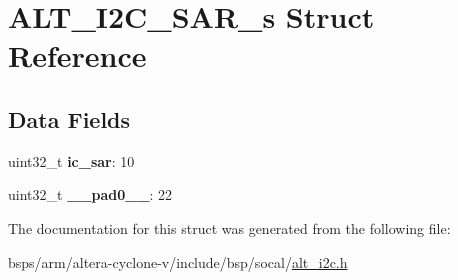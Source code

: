\hypertarget{structALT__I2C__SAR__s}{}\section{A\+L\+T\+\_\+\+I2\+C\+\_\+\+S\+A\+R\+\_\+s Struct Reference}
\label{structALT__I2C__SAR__s}
\subsection*{Data Fields}
\begin{DoxyCompactItemize}
\item 
\mbox{\label{structALT__I2C__SAR__s_a409b8c9e61ebc29fd64042c980d45e53}} 
uint32\+\_\+t {\bfseries ic\+\_\+sar}\+: 10
\item 
\mbox{\label{structALT__I2C__SAR__s_ad00be89795679c8f2c34365d183e3598}} 
uint32\+\_\+t {\bfseries \+\_\+\+\_\+pad0\+\_\+\+\_\+}\+: 22
\end{DoxyCompactItemize}


The documentation for this struct was generated from the following file\+:\begin{DoxyCompactItemize}
\item 
bsps/arm/altera-\/cyclone-\/v/include/bsp/socal/\mbox{\hyperlink{socal_2alt__i2c_8h}{alt\+\_\+i2c.\+h}}\end{DoxyCompactItemize}
